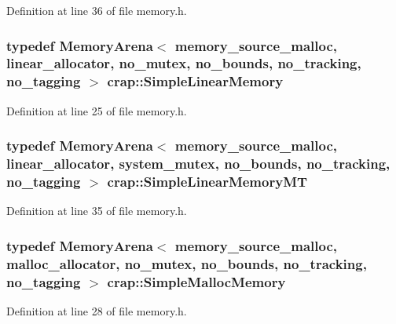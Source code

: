 Definition at line 36 of file memory.\+h.

\hypertarget{namespacecrap_a15a43bda87dfd4f909e30e1df3b1cee7}{
\subsubsection[{Simple\+Linear\+Memory}]{\setlength{\rightskip}{0pt plus 5cm}typedef {\bf Memory\+Arena}$<$ {\bf memory\+\_\+source\+\_\+malloc}, {\bf linear\+\_\+allocator}, {\bf no\+\_\+mutex}, {\bf no\+\_\+bounds}, {\bf no\+\_\+tracking}, {\bf no\+\_\+tagging} $>$ {\bf crap\+::\+Simple\+Linear\+Memory}}}\label{namespacecrap_a15a43bda87dfd4f909e30e1df3b1cee7}


Definition at line 25 of file memory.\+h.

\hypertarget{namespacecrap_a98a843d877d8c0558c40574d0a0019e3}{
\subsubsection[{Simple\+Linear\+Memory\+M\+T}]{\setlength{\rightskip}{0pt plus 5cm}typedef {\bf Memory\+Arena}$<$ {\bf memory\+\_\+source\+\_\+malloc}, {\bf linear\+\_\+allocator}, {\bf system\+\_\+mutex}, {\bf no\+\_\+bounds}, {\bf no\+\_\+tracking}, {\bf no\+\_\+tagging} $>$ {\bf crap\+::\+Simple\+Linear\+Memory\+M\+T}}}\label{namespacecrap_a98a843d877d8c0558c40574d0a0019e3}


Definition at line 35 of file memory.\+h.

\hypertarget{namespacecrap_a8711640793bf2ed760185fe66c8e3d03}{
\subsubsection[{Simple\+Malloc\+Memory}]{\setlength{\rightskip}{0pt plus 5cm}typedef {\bf Memory\+Arena}$<$ {\bf memory\+\_\+source\+\_\+malloc}, {\bf malloc\+\_\+allocator}, {\bf no\+\_\+mutex}, {\bf no\+\_\+bounds}, {\bf no\+\_\+tracking}, {\bf no\+\_\+tagging} $>$ {\bf crap\+::\+Simple\+Malloc\+Memory}}}\label{namespacecrap_a8711640793bf2ed760185fe66c8e3d03}


Definition at line 28 of file memory.\+h.

